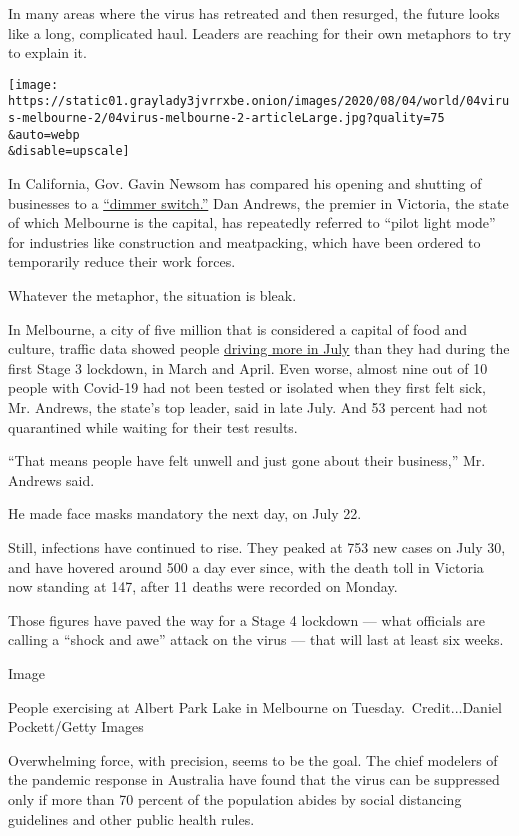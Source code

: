 In many areas where the virus has retreated and then resurged, the
future looks like a long, complicated haul. Leaders are reaching for
their own metaphors to try to explain it.

\texttt{[image: https://static01.graylady3jvrrxbe.onion/images/2020/08/04/world/04virus-melbourne-2/04virus-melbourne-2-articleLarge.jpg?quality=75\\\&auto=webp\\\&disable=upscale]}

In California, Gov. Gavin Newsom has compared his opening and shutting
of businesses to a
\href{https://www.nytimes3xbfgragh.onion/2020/06/30/us/coronavirus-california-cases-rising.html}{``dimmer
switch.''} Dan Andrews, the premier in Victoria, the state of which
Melbourne is the capital, has repeatedly referred to ``pilot light
mode'' for industries like construction and meatpacking, which have been
ordered to temporarily reduce their work forces.

Whatever the metaphor, the situation is bleak.

In Melbourne, a city of five million that is considered a capital of
food and culture, traffic data showed people
\href{https://www.theage.com.au/national/victoria/lockdown-2-0-traffic-worse-compared-with-april-but-less-than-pre-covid-20200801-p55hlq.html}{driving
more in July} than they had during the first Stage 3 lockdown, in March
and April. Even worse, almost nine out of 10 people with Covid-19 had
not been tested or isolated when they first felt sick, Mr. Andrews, the
state's top leader, said in late July. And 53 percent had not
quarantined while waiting for their test results.

``That means people have felt unwell and just gone about their
business,'' Mr. Andrews said.

He made face masks mandatory the next day, on July 22.

Still, infections have continued to rise. They peaked at 753 new cases
on July 30, and have hovered around 500 a day ever since, with the death
toll in Victoria now standing at 147, after 11 deaths were recorded on
Monday.

Those figures have paved the way for a Stage 4 lockdown --- what
officials are calling a ``shock and awe'' attack on the virus --- that
will last at least six weeks.

Image

People exercising at Albert Park Lake in Melbourne on
Tuesday.~Credit...Daniel Pockett/Getty Images

Overwhelming force, with precision, seems to be the goal. The chief
modelers of the pandemic response in Australia have found that the virus
can be suppressed only if more than 70 percent of the population abides
by social distancing guidelines and other public health rules.


